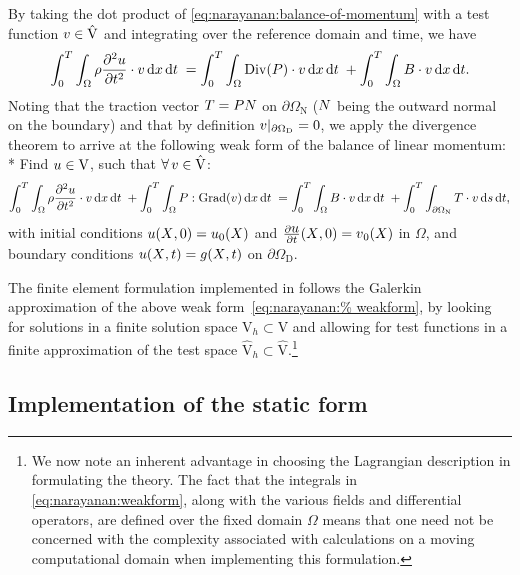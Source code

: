 By taking the dot product of \eqref{eq:narayanan:balance-of-momentum}
with a test function $\mbox{$ v$} \in \hat{\mathrm{V}}$ and integrating over
the reference domain and time, we have
\begin{equation}
  \int_{0}^{T} \int_{\Omega} \rho \frac{\partial^{2}
    \mbox{$ u$}}{\partial t^{2}} \cdot \mbox{$ v$} \, \mathrm{d}x \, \mathrm{d}t\;
  = \int_{0}^{T}\int_{\Omega} \mathrm{Div}(\mbox{$ P$}) \cdot \mbox{$ v$} \, \mathrm{d}x \, \mathrm{d}t\;
  + \int_{0}^{T} \int_{\Omega} \mbox{$ B$} \cdot \mbox{$ v$} \, \mathrm{d}x \, \mathrm{d}t.
\end{equation}
Noting that the traction vector $\mbox{$ T$} = \mbox{$ P$} \mbox{$ N$}$ on
$\partial\Omega_{\mathrm{N}}$ ($\mbox{$ N$}$ being the outward normal on the
boundary) and that by definition $\mbox{$ v$}|_{\partial\Omega_{\mathrm{D}}} =
0$, we apply the divergence theorem to arrive at the following weak
form of the balance of linear momentum: \\*
Find $\mbox{$ u$} \in \mathrm{V}$, such that $\forall\, \mbox{$ v$} \in
\hat{\mathrm{V}}$:
\begin{equation}
  \int_{0}^{T} \int_{\Omega} \rho \frac{\partial^{2} \mbox{$ u$}}{\partial
    t^{2}} \cdot \mbox{$ v$} \, \mathrm{d}x \, \mathrm{d}t\; + \int_{0}^{T} \int_{\Omega}
  \mbox{$ P$}:\mathrm{Grad}(\mbox{$ v$}) \, \mathrm{d}x \, \mathrm{d}t\; = \int_{0}^{T} \int_{\Omega} \mbox{$ B$}
  \cdot \mbox{$ v$} \, \mathrm{d}x \, \mathrm{d}t\; + \int_{0}^{T} \int_{\partial\Omega_{\mathrm{N}}}
  \mbox{$ T$} \cdot \mbox{$ v$} \, \mathrm{d}s \, \mathrm{d}t,
\label{eq:narayanan:weakform}
\end{equation}
with initial conditions $\mbox{$ u$}(\mbox{$ X$}, 0) = \mbox{$ u$}_{0}(\mbox{$ X$})$ and
$\frac{\partial\mbox{$ u$}}{\partial t}(\mbox{$ X$}, 0) = \mbox{$ v$}_{0}(\mbox{$ X$})$ in $\Omega$,
and boundary conditions $\mbox{$ u$}(\mbox{$ X$}, t) = \mbox{$ g$}(\mbox{$ X$}, t)$ on
$\partial\Omega_{\mathrm{D}}$.

The finite element formulation implemented in \twist{} follows the
Galerkin approximation of the above weak form~\eqref{eq:narayanan:%
weakform}, by looking for solutions in a finite solution space
$\mathrm{V}_{h} \subset \mathrm{V}$ and allowing for test functions in
a finite approximation of the test space $\hat{\mathrm{V}}_{h} \subset
\hat{\mathrm{V}}$.\footnote{We now note an inherent advantage in
  choosing the Lagrangian description in formulating the theory. The
  fact that the integrals in \eqref{eq:narayanan:weakform}, along with
  the various fields and differential operators, are defined over the
  fixed domain $\Omega$ means that one need not be concerned with the
  complexity associated with calculations on a moving computational
  domain when implementing this formulation.}

\vspace*{-3pt}
\subsection{Implementation of the static form}

